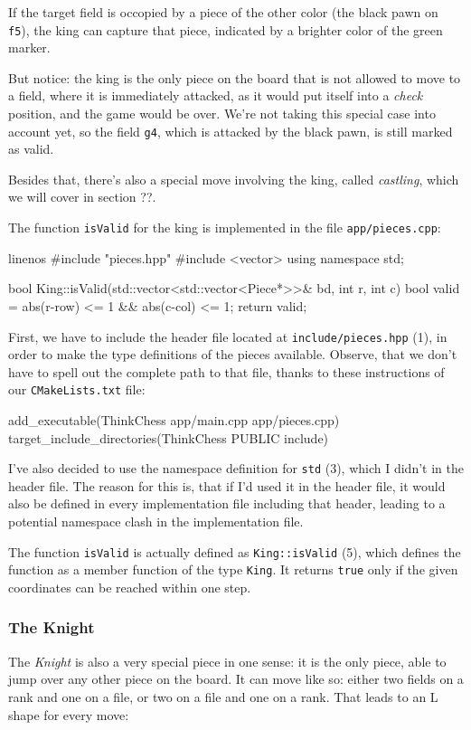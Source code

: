 If the target field is occopied by a piece of the other color (the black pawn on \texttt{f5}),
the king can capture that piece, indicated by a brighter color of the green marker.

But notice: the king is the only piece on the board that is not allowed to move to a field,
where it is immediately attacked, as it would put
itself into a \emph{check} position, and the game would be over.
We're not taking this special case into account yet, so the field \texttt{g4},
which is attacked by the black pawn, is still marked as valid.

Besides that, there's also a special move involving the king, called \emph{castling},
which we will cover in section ??.

The function \texttt{isValid} for the king is implemented in the file
\texttt{app/pieces.cpp}:

\begin{cpp*}{linenos}
#include "pieces.hpp"
#include <vector>
using namespace std;

bool King::isValid(std::vector<std::vector<Piece*>>& bd, int r, int c) {
  bool valid = abs(r-row) <= 1 && abs(c-col) <= 1;
  return valid;
}
\end{cpp*}

First, we have to include the header file located at \texttt{include/pieces.hpp} (1),
in order to make the type definitions of the pieces available.
Observe, that we don't have to spell out the complete path to that file, thanks to these
instructions of our \texttt{CMakeLists.txt} file:

\begin{cpp}
add_executable(ThinkChess app/main.cpp app/pieces.cpp)
target_include_directories(ThinkChess PUBLIC include)
\end{cpp}

I've also decided to use the namespace definition for \texttt{std} (3), which I
didn't in the header file.
The reason for this is, that if I'd used it in the header file, it would also be defined in
every implementation file including that header, leading to a potential namespace clash in the
implementation file.

The function \texttt{isValid} is actually defined as
\texttt{King::isValid} (5), which defines the function as a member function of the
type \texttt{King}.
It returns \texttt{true} only if the given coordinates can be reached within one step.

\subsubsection{The Knight}
The \emph{Knight} is also a very special piece in one sense: it is the only piece, able to
jump over any other piece on the board.
It can move like so: either two fields on a rank and one on a file, or two on a file and one on
a rank.
That leads to an L shape for every move:

